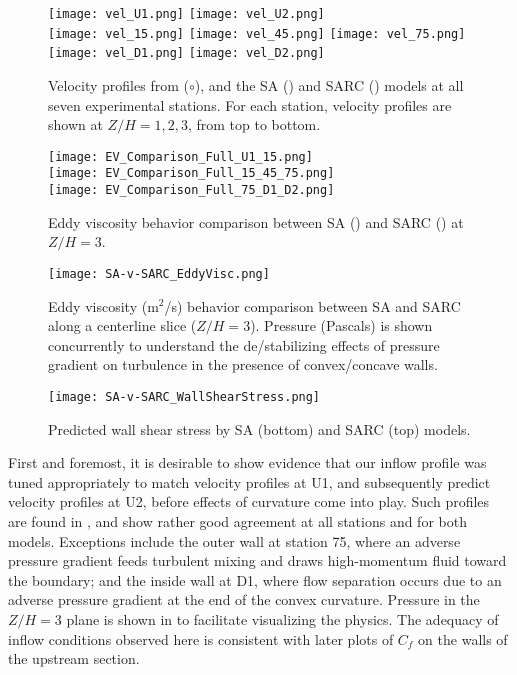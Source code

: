 \documentclass[11pt]{article}
\begin{document}
\begin{figure}[p]
\centering
\texttt{[image: vel\_U1.png]}
\texttt{[image: vel\_U2.png]}\\
\texttt{[image: vel\_15.png]}
\texttt{[image: vel\_45.png]}
\texttt{[image: vel\_75.png]}\\
\texttt{[image: vel\_D1.png]}
\texttt{[image: vel\_D2.png]}
\caption{Velocity profiles from \citet{kim1994} ($\circ$), and the SA ({\color{blue}\solidrule[6mm]}) and SARC ({\color{red}\dashrule}) models at all seven experimental stations. For each station, velocity profiles are shown at $Z/H = 1, 2, 3$, from top to bottom.}
\label{fig:velocity_slices}
\end{figure}

\begin{figure}[p]
\centering
\texttt{[image: EV\_Comparison\_Full\_U1\_15.png]}\\
\texttt{[image: EV\_Comparison\_Full\_15\_45\_75.png]}\\
\texttt{[image: EV\_Comparison\_Full\_75\_D1\_D2.png]}
\caption{Eddy viscosity behavior comparison between SA (\solidrule[6mm]) and SARC (\dashrule) at $Z/H=3$.}
\label{fig:ev_lines}
\end{figure}

\begin{figure}[t!]
\centering
\texttt{[image: SA-v-SARC\_EddyVisc.png]}
\caption{Eddy viscosity (m$^2$/s) behavior comparison between SA and SARC along a centerline slice ($Z/H=3$). Pressure (Pascals) is shown concurrently to understand the de/stabilizing effects of pressure gradient on turbulence in the presence of convex/concave walls.}
\label{fig:ev_slices}
\end{figure}

\begin{figure}[t!]
\centering
\texttt{[image: SA-v-SARC\_WallShearStress.png]}
\caption{Predicted wall shear stress by SA (bottom) and SARC (top) models.}
\label{fig:wss}
\end{figure}

First and foremost, it is desirable to show evidence that our inflow profile was tuned appropriately to match velocity profiles at U1, and subsequently predict velocity profiles at U2, before effects of curvature come into play. Such profiles are found in , and show rather good agreement at all stations and for both models. Exceptions include the outer wall at station 75, where an adverse pressure gradient feeds turbulent mixing and draws high-momentum fluid toward the boundary; and the inside wall at D1, where flow separation occurs due to an adverse pressure gradient at the end of the convex curvature. Pressure in the $Z/H=3$ plane is shown in  to facilitate visualizing the physics. The adequacy of inflow conditions observed here is consistent with later plots of $C_f$ on the walls of the upstream section.
\end{document}
